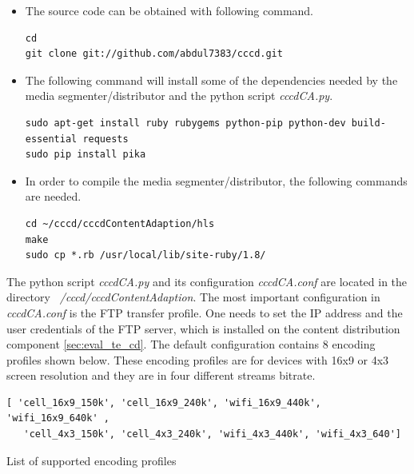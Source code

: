 \begin{itemize}

\item The source code can be obtained with following command.

\begin{code}
\begin{verbatim}
cd
git clone git://github.com/abdul7383/cccd.git
\end{verbatim}
\end{code}

\item The following command will install some of the dependencies needed by the media segmenter/distributor and the python script \textit{cccdCA.py}.

\begin{code}
\begin{verbatim}
sudo apt-get install ruby rubygems python-pip python-dev build-essential requests
sudo pip install pika
\end{verbatim}
\end{code}

\item In order to compile the media segmenter/distributor, the following commands are needed.

\begin{code}
\begin{verbatim}
cd ~/cccd/cccdContentAdaption/hls
make
sudo cp *.rb /usr/local/lib/site-ruby/1.8/
\end{verbatim}
\end{code}

\end{itemize} 

The python script \textit{cccdCA.py} and its configuration \textit{cccdCA.conf} are located in the directory \textit{~/cccd/cccdContentAdaption}. The most important configuration in \textit{ cccdCA.conf}  is the FTP transfer profile. One needs to set the IP address and the user credentials of the FTP server, which is installed on the content distribution component \ref{sec:eval_te_cd}. The default configuration contains 8 encoding profiles shown below. These encoding profiles are for devices with 16x9 or 4x3 screen resolution and they are in four different streams bitrate.

\begin{code}
\begin{verbatim}
[ 'cell_16x9_150k', 'cell_16x9_240k', 'wifi_16x9_440k', 'wifi_16x9_640k' ,
   'cell_4x3_150k', 'cell_4x3_240k', 'wifi_4x3_440k', 'wifi_4x3_640']
\end{verbatim}
\caption{List of supported encoding profiles}
\label{lst:encoding_profiles}
\end{code}

